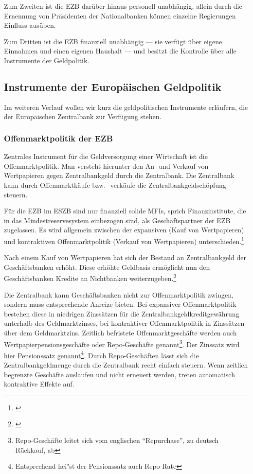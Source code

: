 \documentclass[
        onecolumn,
        a4paper,
        abstracton,
        parskip=half
        ,final
        ]{scrartcl}
\begin{document}
Zum Zweiten ist die EZB dar{\"u}ber hinaus personell unabh{\"a}ngig, allein durch die Ernennung von Pr{\"a}sidenten der Nationalbanken k{\"o}nnen einzelne Regierungen Einfluss aus{\"u}ben.

Zum Dritten ist die EZB finanziell unabh{\"a}ngig --- sie verf{\"u}gt {\"u}ber eigene Einnahmen und einen eigenen Haushalt --- und besitzt die Kontrolle {\"u}ber alle Instrumente der Geldpolitik.

\subsection{Instrumente der Europ{\"a}ischen Geldpolitik}  %

Im weiteren Verlauf wollen wir kurz die geldpolitischen Instrumente erl{\"a}ufern, die der Europ{\"a}ischen Zentralbank zur Verf{\"u}gung stehen.



\subsubsection{Offenmarktpolitik der EZB}  %

Zentrales Instrument f{\"u}r die Geldversorgung einer Wirtschaft ist die Offenmarktpolitik. Man versteht hierunter den An- und Verkauf von Wertpapieren gegen Zentralbankgeld durch die Zentralbank.
Die Zentralbank kann durch Offenmarktk{\"a}ufe bzw. -verk{\"a}ufe die Zentralbankgeldsch{\"o}pfung steuern.

F{\"u}r die EZB im \ac{ESZB} sind nur finanziell solide \ac{MFIs}, sprich Finanzinstitute, die in das Mindestreservesystem einbezogen sind, als Gesch{\"a}ftspartner der \ac{EZB} zugelassen. Es wird allgemein zwischen der expansiven (Kauf von Wertpapieren) und kontraktiven Offenmarktpolitik (Verkauf von Wertpapieren) unterschieden.\footnote[54]{\citep*[S.556]{Basseler2010}}

Nach einem Kauf von Wertpapieren hat sich der Bestand an Zentralbankgeld der Gesch{\"a}ftsbanken erh{\"o}ht. Diese erh{\"o}hte Geldbasis erm{\"o}glicht nun den Gesch{\"a}ftsbanken Kredite an Nichtbanken weiterzugeben.\footnote[55]{\citep*[S.557]{Basseler2010}}


Die Zentralbank kann Gesch{\"a}ftsbanken nicht zur Offenmarktpolitik zwingen, sondern muss entsprechende Anreize bieten. Bei expansiver Offenmarktpolitik bestehen diese in niedrigen Zinss{\"a}tzen f{\"u}r die Zentralbankgeldkreditgew{\"a}hrung unterhalb des Geldmarktzinses, bei kontraktiver Offenmarktpolitik in Zinss{\"a}tzen {\"u}ber dem Geldmarktzins.
Zeitlich befristete Offenmarktgesch{\"a}fte werden auch Wertpapierpensionsgesch{\"a}fte oder Repo-Gesch{\"a}fte genannt\footnote[36]{Repo-Gesch{\"a}fte leitet sich vom englischen "`Repurchase"', zu deutsch R{\"u}ckkauf, ab}. Der Zinssatz wird hier Pensionssatz genannt\footnote[37]{Entsprechend hei{"s}t der Pensionssatz auch Repo-Rate}.
Durch Repo-Gesch{\"a}ften l{\"a}sst sich die Zentralbankgeldmenge durch die Zentralbank recht einfach steuern. Wenn zeitlich begrenzte Gesch{\"a}fte auslaufen und nicht erneuert werden, treten automatisch kontraktive Effekte auf.
\end{document}

